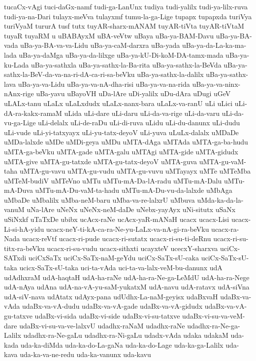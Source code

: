 {tucaCx-vAgi
tuci-daGx-namf
tudi-ga-LanUnx
tudiya
tudi-yalilx
tudi-ya-lilx-ruva
tudi-ya-na-Dari
tulayx-meVva
tulayxmf
tumu-la-ga-Lige
tupapx
tupapxda
turiVya
turiVyaM
tururA
tusf
tutx
tuyAR-sharx-mANAM
tuyAR-tiVta
tuyAR-tiVtaM
tuyaR
tuyaRM
u
uBABAyxM
uBA-veVtw
uBaya
uBa-ya-BAM-Davu
uBa-ya-BA-vada
uBa-ya-BA-va-va-Lidu
uBa-ya-caM-darxra
uBa-yada
uBa-ya-da-La-ka-ma-lada
uBa-ya-daMga
uBa-ya-da-lilxge
uBa-ya-kU-Di-koM-DA-tamx-mada
uBa-ya-ku-Lada
uBa-ya-sathxla
uBa-ya-sathx-la-Ba-rita
uBa-ya-sathx-la-BeVda
uBa-ya-sathx-la-BeV-da-va-na-ri-dA-ca-ri-sa-beVku
uBa-ya-sathx-la-dalilx
uBa-ya-sathx-lava
uBa-ya-va-Lidu
uBa-ya-va-nA-dha-risi
uBa-ya-va-na-rida
uBa-ya-va-ninx-nAnx-rige
uBa-yavu
uBayoVH
uDa-lAre
uDi-yalilx
uDu-dAra
uDugi
uGeV
uLALx-tanu
uLaLx
uLaLxdudx
uLaLx-nanx-bara
uLaLx-va-ranU
uLi
uLici
uLi-dA-ra-kakx-ramaM
uLida
uLi-dare
uLi-daru
uLi-da-va-rige
uLi-da-varu
uLi-da-vu-ga-Lige
uLi-delalx
uLi-de-raDu
uLi-di-ruva
uLidu
uLi-du-danunx
uLi-dudu
uLi-vude
uLi-yi-tatxyayx
uLi-yu-tatx-deyoV
uLi-yuva
uLuLx-dalalx
uMDaDe
uMDa-lalxde
uMDe
uMDi-geya
uMDu
uMTA-dAga
uMTAda
uMTA-ga-ba-hudu
uMTA-ga-beVku
uMTA-gade
uMTA-galu
uMTAgi
uMTA-gide
uMTA-gidudx
uMTA-give
uMTA-gu-tatxde
uMTA-gu-tatx-deyoV
uMTA-guva
uMTA-gu-vaM-taha
uMTA-gu-vavu
uMTA-gu-vudu
uMTA-gu-vuvu
uMTayayx
uMTe
uMTeMba
uMTeM-budiV
uMTeVno
uMTu
uMTu-mA-Da-lA-radu
uMTu-mA-Dalu
uMTu-mA-Duva
uMTu-mA-Du-vaM-ta-hadu
uMTu-mA-Du-vu-da-lalxde
uMbAga
uMbaDe
uMbalilx
uMba-neM-baru
uMba-va-re-lalxrU
uMbuva
uMda-ka-da-la-vanuM
uNa-lAre
uNeNx
uNeNx-neM-daDe
uNebx-yayAyx
uNi-situtx
uSaNx
uSiNxkf
uTaTxDe
ubibx
ucAcx-raNe
ucAcx-yaR-mANaH
ucacx
ucacx-Lisi
ucacx-Li-si-hA-yidu
ucacx-neY-ti-kA-ca-ra-Ne-yu-LaLx-va-nA-gi-ra-beVku
ucacx-ra-Nada
ucacx-reVtf
ucacx-ri-pude
ucacx-ri-sutatx
ucacx-ri-su-ti-deRnu
ucacx-ri-su-titx-ra-beVku
ucacx-ri-su-vudu
ucacx-sithxti
ucayxteV
ucecxY-sharxva
uciCx-SATxdi
uciCxSaTx
uciCx-SaTx-naM-geYdu
uciCx-SaTx-sU-caka
uciCx-SaTx-sU-taka
ucicx-SaTx-sU-taka
uci-ta-vAda
uci-ta-va-lalx-veM-bu-danunx
udA
udAdhxraM
udA-haqtaH
udA-ha-raNe
udA-ha-ra-Ne-ga-LeMdU
udA-ha-ra-Nege
udA-nAya
udAna
udA-na-vA-yu-saM-yukatxM
udA-navu
udA-ratavx
udA-siVna
udA-siV-nava
udAtatx
udAyx-pana
udUdhx-La-naM-geyisx
udaBxvaH
udaBx-va-vAda
udaBx-va-vA-dudu
udaBx-va-vA-gade
udaBx-va-vA-gidudx
udaBx-va-vA-gu-tatxve
udaBx-vi-sida
udaBx-vi-side
udaBx-vi-su-tatxve
udaBx-vi-su-va-veM-dare
udaBx-vi-su-va-ve-lalxvU
udadhx-raNaM
udadhx-raNe
udadhx-ra-Ne-ga-Lalilx
udadhx-ra-Ne-gaLu
udadhx-ra-Ni-gaLu
udadx-vAda
udaka
udakaM
uda-kada
uda-ka-diMda
uda-ka-do-La-gaNa
uda-ka-do-Lage
uda-ka-ga-Lalilx
uda-kava
uda-ka-va-ne-redu
uda-ka-vanunx
uda-kavu
}
